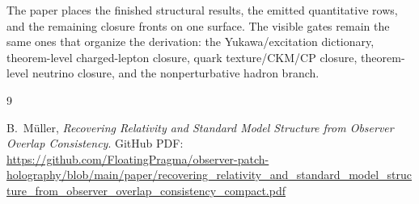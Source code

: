 \documentclass[11pt]{article}
\begin{document}
The paper places the finished structural results, the emitted quantitative rows, and the
remaining closure fronts on one surface. The visible gates remain the same ones that
organize the derivation: the Yukawa/excitation dictionary, theorem-level charged-lepton closure,
quark texture/CKM/CP closure, theorem-level neutrino closure, and the nonperturbative hadron
branch.

\begin{thebibliography}{9}

B.\ M\"uller,
\emph{Recovering Relativity and Standard Model Structure from Observer Overlap Consistency}.
GitHub PDF:
\url{https://github.com/FloatingPragma/observer-patch-holography/blob/main/paper/recovering_relativity_and_standard_model_structure_from_observer_overlap_consistency_compact.pdf}

\end{thebibliography}
\end{document}
